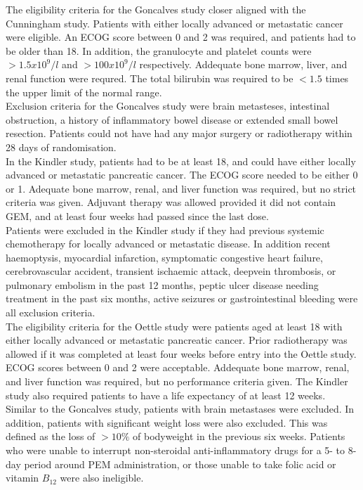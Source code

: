 The eligibility criteria for the Goncalves study closer aligned with the Cunningham study. Patients with either locally advanced or metastatic cancer were eligible. An ECOG score between 0 and 2 was required, and patients had to be older than 18. In addition, the granulocyte and platelet counts were $>1.5x10^9/l$ and $>100x10^9/l$ respectively. Addequate bone marrow, liver, and renal function were requred. The total bilirubin was required to be $< 1.5$ times the upper limit of the normal range. \\

Exclusion criteria for the Goncalves study were brain metasteses, intestinal obstruction, a history of inflammatory bowel disease or extended small bowel resection. Patients could not have had any major surgery or radiotherapy within 28 days of randomisation. \\

In the Kindler study, patients had to be at least 18, and could have either locally advanced or metastatic pancreatic cancer. The ECOG score needed to be either 0 or 1. Adequate bone marrow, renal, and liver function was required, but no strict criteria was given. Adjuvant therapy was allowed provided it did not contain GEM, and at least four weeks had passed since the last dose. \\

Patients were excluded in the Kindler study if they had previous systemic chemotherapy for locally advanced or metastatic disease. In addition recent haemoptysis, myocardial infarction, symptomatic congestive heart failure, cerebrovascular accident, transient ischaemic attack, deepvein thrombosis, or pulmonary embolism in the past 12 months, peptic ulcer disease needing treatment in the past six months, active seizures or gastrointestinal bleeding were all exclusion criteria. \\

The eligibility criteria for the Oettle study were patients aged at least 18 with either locally advanced or metastatic pancreatic cancer. Prior radiotherapy was allowed if it was completed at least four weeks before entry into the Oettle study. ECOG scores between 0 and 2 were acceptable. Addequate bone marrow, renal, and liver function was required, but no performance criteria given. The Kindler study also required patients to have a life expectancy of at least 12 weeks. \\

Similar to the Goncalves study, patients with brain metastases were excluded. In addition, patients with significant weight loss were also excluded. This was defined as the loss of $>10\%$ of bodyweight in the previous six weeks. Patients who were unable to interrupt non-steroidal anti-inflammatory drugs for a 5- to 8-day period around PEM administration, or those unable to take folic acid or vitamin $B_{12}$ were also ineligible. \\

